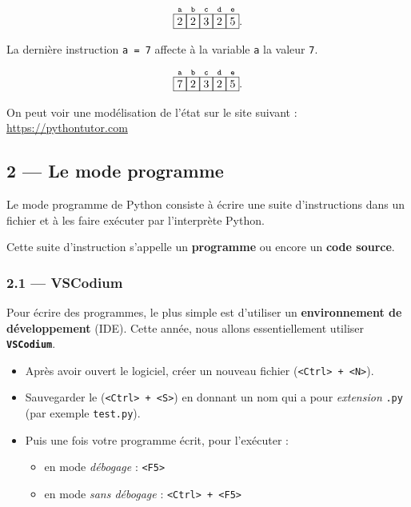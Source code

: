 \documentclass[a4paper,17pt]{extarticle}
\providecommand{\tightlist}{%
      \setlength{\itemsep}{0pt}\setlength{\parskip}{0pt}}
\begin{document}
\begin{reponse}
\[
\overset{\texttt{a}}{\fbox{2}}\overset{\texttt{b}}{\fbox{2}}\overset{\texttt{c}}{\fbox{3}}\overset{\texttt{d}}{\fbox{2}}\overset{\texttt{e}}{\fbox{5}}.
\]

La dernière instruction \texttt{a\ =\ 7} affecte à la variable
\texttt{a} la valeur \texttt{7}.

\[
\overset{\texttt{a}}{\fbox{7}}\overset{\texttt{b}}{\fbox{2}}\overset{\texttt{c}}{\fbox{3}}\overset{\texttt{d}}{\fbox{2}}\overset{\texttt{e}}{\fbox{5}}.
\]

On peut voir une modélisation de l'état sur le site suivant :
\href{https://pythontutor.com/visualize.html\#code=a\%20\%3D\%201\%0Ab\%20\%3D\%202\%0Ac\%20\%3D\%203\%0Ad\%20\%3D\%20-12\%0A\%0Aa\%20\%3D\%20c\%20-\%20a\%0Ae\%20\%3D\%20b\%20\%2B\%20c\%0A\%0Ad\%20\%3D\%20a\%0Aa\%20\%3D\%207\&cumulative=true\&curInstr=0\&heapPrimitives=true\&mode=display\&origin=opt-frontend.js\&py=3\&rawInputLstJSON=\%5B\%5D\&textReferences=false}{https://pythontutor.com}

        \end{reponse}
    \hypertarget{le-mode-programme}{%
\subsection{2 --- Le mode programme}\label{le-mode-programme}}

Le mode programme de Python consiste à écrire une suite d'instructions
dans un fichier et à les faire exécuter par l'interprète Python.

Cette suite d'instruction s'appelle un \textbf{programme} ou encore un
\textbf{code source}.

    \hypertarget{vscodium}{%
\subsubsection{2.1 --- VSCodium}\label{vscodium}}

Pour écrire des programmes, le plus simple est d'utiliser un
\textbf{environnement de développement} (IDE). Cette année, nous allons
essentiellement utiliser \textbf{\texttt{VSCodium}}.

\begin{itemize}
\tightlist
\item
  Après avoir ouvert le logiciel, créer un nouveau fichier
  (\texttt{\textless{}Ctrl\textgreater{}\ +\ \textless{}N\textgreater{}}).
\item
  Sauvegarder le
  (\texttt{\textless{}Ctrl\textgreater{}\ +\ \textless{}S\textgreater{}})
  en donnant un nom qui a pour \emph{extension} \texttt{.py} (par
  exemple \texttt{test.py}).
\item
  Puis une fois votre programme écrit, pour l'exécuter :

  \begin{itemize}
  \tightlist
  \item
    en mode \emph{débogage} : \texttt{\textless{}F5\textgreater{}}
  \item
    en mode \emph{sans débogage} :
    \texttt{\textless{}Ctrl\textgreater{}\ +\ \textless{}F5\textgreater{}}
  \end{itemize}
\end{itemize}
\end{document}
